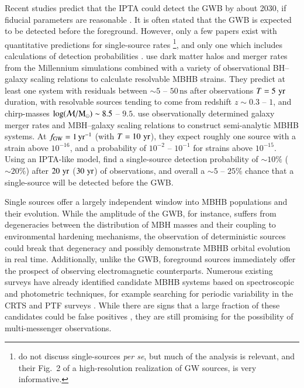 \documentclass[useAMS, usenatbib]{mnras}  %
\newcommand{\mchirp}{\mathcal{M}}     %
\newcommand{\fgw}{f_\tr{GW}}
\newcommand{\nanos}{\textrm{ns}}
\begin{document}
    Recent studies predict that the IPTA could detect the GWB by about 2030, if fiducial parameters are reasonable \citep[e.g.][]{taylor2016, paper2}.  It is often stated that the GWB is expected to be detected before the foreground.  However, only a few papers exist with quantitative predictions for single-source rates \citep{sesana2009, ravi2014}\footnote{\citet{roebber2016} do not discuss single-sources \textit{per se}, but much of the analysis is relevant, and their Fig.~2 of a high-resolution realization of GW sources, is very informative.}, and only one which includes calculations of detection probabilities \citep{rsg15}.  \citet{sesana2009} use dark matter halos and merger rates from the Millennium simulations combined with a variety of observational BH--galaxy scaling relations to calculate resolvable MBHB strains.  They predict at least one system with residuals between $\sim 5$ -- $50 \, \nanos$ after observations $T = 5\, \,\mathrm{yr}$ duration, with resolvable sources tending to come from redshift $z \sim 0.3$ -- $1$, and chirp-masses $\log (\mchirp/\msol) \sim 8.5$ -- $9.5$.  \citet{ravi2014} use observationally determined galaxy merger rates and MBH--galaxy scaling relations to construct semi-analytic MBHB systems.  At $\fgw = 1 \, \pyr$ (with $T = 10 \, \,\mathrm{yr}$), they expect roughly one source with a strain above $10^{-16}$, and a probability of $10^{-2}$ -- $10^{-1}$ for strains above  $10^{-15}$.  Using an IPTA-like model, \citet{rsg15} find a single-source detection probability of $\sim 10\%$ ($\sim 20\%$) after $20 \, \,\mathrm{yr}$ ($30 \, \,\mathrm{yr}$) of observations, and overall a $\sim 5$ -- $25\%$ chance that a single-source will be detected before the GWB.

    Single sources offer a largely independent window into MBHB populations and their evolution.  While the amplitude of the GWB, for instance, suffers from degeneracies between the distribution of MBH masses and their coupling to environmental hardening mechanisms, the observation of deterministic sources could break that degeneracy and possibly demonstrate MBHB orbital evolution in real time.  Additionally, unlike the GWB, foreground sources immediately offer the prospect of observing electromagnetic counterparts.  Numerous existing surveys have already identified candidate MBHB systems based on spectroscopic and photometric techniques, for example searching for periodic variability in the CRTS \citep{charisi2016} and PTF surveys \citep{graham2015}.  While there are signs that a large fraction of these candidates could be false positives \citep{sesana201703}, they are still promising for the possibility of multi-messenger observations.
\end{document}

